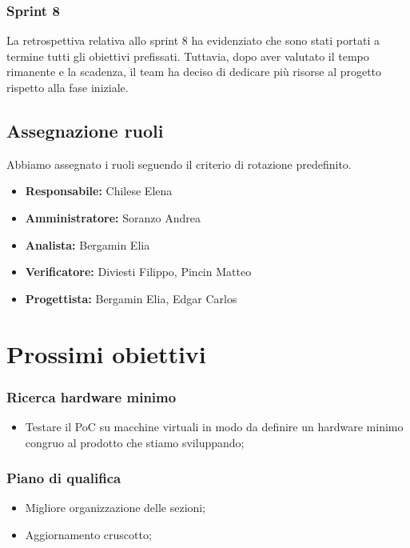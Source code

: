 \subsubsection{Sprint 8}
La retrospettiva relativa allo sprint 8 ha evidenziato che sono stati portati a termine tutti gli obiettivi prefissati.
Tuttavia, dopo aver valutato il tempo rimanente e la scadenza, il team ha deciso di dedicare più risorse al progetto rispetto alla fase iniziale.

\subsection{Assegnazione ruoli}
Abbiamo assegnato i ruoli seguendo il criterio di rotazione predefinito.
\begin{itemize}
    \item \textbf{Responsabile:} Chilese Elena
    \item \textbf{Amministratore:} Soranzo Andrea
    \item \textbf{Analista:} Bergamin Elia
    \item \textbf{Verificatore:} Diviesti Filippo, Pincin Matteo
    \item  \textbf{Progettista:} Bergamin Elia, Edgar Carlos
\end{itemize}
\newpage

\section{Prossimi obiettivi}

\subsubsection{Ricerca hardware minimo}
\begin{itemize}
    \item Testare il PoC su macchine virtuali in modo da definire un hardware minimo congruo al prodotto che stiamo sviluppando;
\end{itemize}

\subsubsection{Piano di qualifica}
\begin{itemize}
    \item Migliore organizzazione delle sezioni;
    \item Aggiornamento cruscotto;
\end{itemize}


